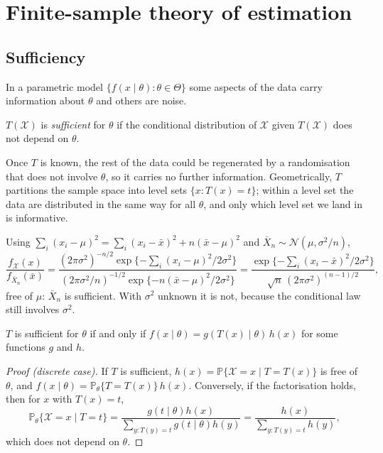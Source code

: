 \documentclass[11pt,a4paper]{article}
\renewcommand{\P}{\mathbb{P}}
\newcommand{\N}{\mathcal{N}}
\newcommand{\Xbar}{\bar X_n}
\begin{document}
\section{Finite-sample theory of estimation}\label{sec:finite}

\subsection{Sufficiency}

In a parametric model $\{f(x\mid\theta):\theta\in\Theta\}$ some aspects of the data carry information about $\theta$ and others are noise.

\begin{definition}
$T(\mathcal X)$ is \emph{sufficient} for $\theta$ if the conditional distribution of $\mathcal X$ given $T(\mathcal X)$ does not depend on $\theta$.
\end{definition}

Once $T$ is known, the rest of the data could be regenerated by a randomisation that does not involve $\theta$, so it carries no further information. Geometrically, $T$ partitions the sample space into level sets $\{x:T(x)=t\}$; within a level set the data are distributed in the same way for all $\theta$, and only which level set we land in is informative.

\begin{example}
Using $\sum_i(x_i-\mu)^2=\sum_i(x_i-\bar x)^2+n(\bar x-\mu)^2$ and $\Xbar\sim\N(\mu,\sigma^2/n)$,
\[
\frac{f_{\mathcal X}(x)}{f_{\Xbar}(\bar x)}=\frac{(2\pi\sigma^2)^{-n/2}\exp\{-\sum_i(x_i-\mu)^2/2\sigma^2\}}{(2\pi\sigma^2/n)^{-1/2}\exp\{-n(\bar x-\mu)^2/2\sigma^2\}}=\frac{\exp\{-\sum_i(x_i-\bar x)^2/2\sigma^2\}}{\sqrt n\,(2\pi\sigma^2)^{(n-1)/2}},
\]
free of $\mu$: $\Xbar$ is sufficient. With $\sigma^2$ unknown it is not, because the conditional law still involves $\sigma^2$.
\end{example}

\begin{theorem}[Factorisation]\label{thm:factor}
$T$ is sufficient for $\theta$ if and only if $f(x\mid\theta)=g(T(x)\mid\theta)\,h(x)$ for some functions $g$ and $h$.
\end{theorem}

\begin{proof}[Proof \textup{(}discrete case\textup{)}]
If $T$ is sufficient, $h(x)=\P\{\mathcal X=x\mid T=T(x)\}$ is free of $\theta$, and $f(x\mid\theta)=\P_\theta\{T=T(x)\}\,h(x)$. Conversely, if the factorisation holds, then for $x$ with $T(x)=t$,
\[
\P_\theta\{\mathcal X=x\mid T=t\}=\frac{g(t\mid\theta)h(x)}{\sum_{y:T(y)=t}g(t\mid\theta)h(y)}=\frac{h(x)}{\sum_{y:T(y)=t}h(y)},
\]
which does not depend on $\theta$.
\end{proof}
\end{document}
